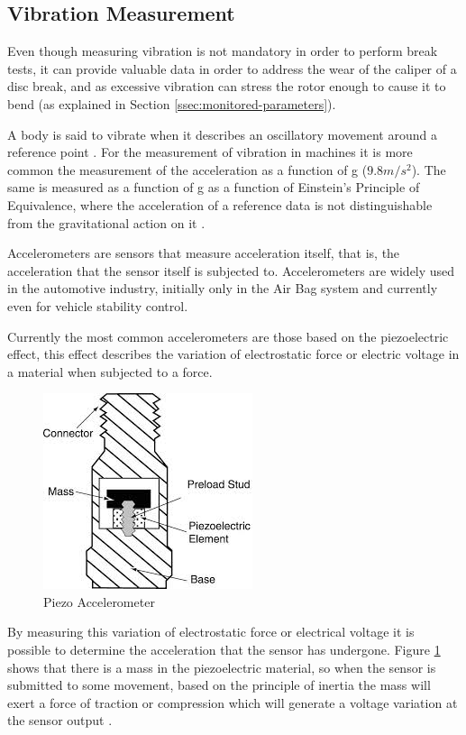 \subsection{Vibration Measurement}\label{ssec:vibrationMeasurement}
		
		Even though measuring vibration is not mandatory in order to perform break tests, it can provide valuable data in order to address the wear of the caliper of a disc break, and as excessive vibration can stress the rotor enough to cause it to bend (as explained in Section \ref{ssec:monitored-parameters}).
		\par
		A body is said to vibrate when it describes an oscillatory movement around a reference point \cite{joaocan2000}. For the measurement of vibration in machines it is more common the measurement of the acceleration as a function of g ($9.8m/s^2$). The same is measured as a function of g as a function of Einstein's Principle of Equivalence, where the acceleration of a reference data is not distinguishable from the gravitational action on it \cite{nordtvedt1968equivalence}.
		\par
		Accelerometers are sensors that measure acceleration itself, that is, the acceleration that the sensor itself is subjected to. Accelerometers are widely used in the automotive industry, initially only in the Air Bag system and currently even for vehicle stability control.
		\par
		Currently the most common accelerometers are those based on the piezoelectric effect, this effect describes the variation of electrostatic force or electric voltage in a material when subjected to a force.

		\begin{figure}[htbp]
			\centering
				\includegraphics[width=.4\textwidth]{figuras/fig-piezo-acel.jpg}
			\caption{Piezo Accelerometer \cite{piezo-accel}}
			\label{fig:piezoAccelerometer}
		\end{figure}

		By measuring this variation of electrostatic force or electrical voltage it is possible to determine the acceleration that the sensor has undergone. Figure \ref{fig:piezoAccelerometer} shows that there is a mass in the piezoelectric material, so when the sensor is submitted to some movement, based on the principle of inertia the mass will exert a force of traction or compression which will generate a voltage variation at the sensor output \cite{patrick2006}.
